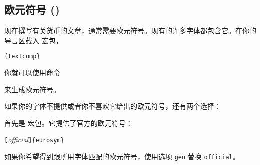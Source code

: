 \subsection{欧元符号 \texorpdfstring{(\officialeuro)}{}}

现在撰写有关货币的文章，通常需要欧元符号。现有的许多字体都包含它。在你的导言区载入  宏包，
\begin{lscommand}
\verb|{textcomp}|
\end{lscommand}
你就可以使用命令
\begin{lscommand}
\end{lscommand}
来生成欧元符号。

如果你的字体不提供或者你不喜欢它给出的欧元符号，还有两个选择：

首先是  宏包。它提供了官方的欧元符号：
\begin{lscommand}
\verb|[|\emph{official}\verb|]{eurosym}|
\end{lscommand}
如果你希望得到跟所用字体匹配的欧元符号，使用选项 \texttt{gen} 替换 \texttt{official}。




